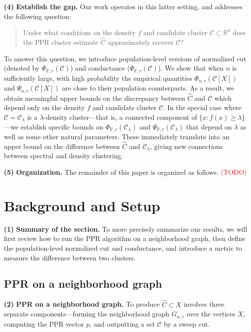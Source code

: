 \documentclass{article}
\newcommand{\Reals}{\mathbb{R}}
\newcommand{\1}{\mathbf{1}}
\newcommand{\Rd}{\Reals^d}
\newcommand{\mc}[1]{\mathcal{#1}}
\newcommand{\Pbb}{\mathbb{P}}
\newcommand{\wh}[1]{\widehat{#1}}
\theoremstyle{alden}
\theoremstyle{aldenthm}
\theoremstyle{definition}
\theoremstyle{remark}
\begin{document}
\textbf{(4)} \textbf{Establish the gap.} Our work operates in this latter setting, and addresses the following question:
\begin{quote}
	Under what conditions on the density $f$ and candidate cluster $\mc{C} \subset \Rd$ does the PPR cluster estimate $\wh{C}$ approximately recover $\mc{C}$?
\end{quote}
To answer this question, we introduce population-level versions of normalized cut (denoted by $\Phi_{\Pbb,r}(\mc{C})$) and conductance ($\Psi_{\Pbb,r}(\mc{C})$). We show that when $n$ is sufficiently large, with high probability the empirical quantities $\Phi_{n,r}(\mc{C}[X])$ and $\Psi_{n,r}(\mc{C}[X])$ are close to their population counterparts. As a result, we obtain meaningful upper bounds on the discrepancy between $\wh{C}$ and $\mc{C}$ which depend only on the density $f$ and candidate cluster $\mc{C}$. In the special case where $\mc{C} = \mc{C}_{\lambda}$ is a $\lambda$-density cluster---that is, a connected component of $\{x: f(x) \geq \lambda \}$---we establish specific bounds on $\Phi_{\Pbb,r}(\mc{C}_{\lambda})$ and $\Psi_{\Pbb,r}(\mc{C}_{\lambda})$ that depend on $\lambda$ as well as some other natural parameters. These immediately translate into an upper bound on the difference between $\wh{C}$ and $\mc{C}_{\lambda}$, giving new connections between spectral and density clustering.

\textbf{(5)} \textbf{Organization.} The remainder of this paper is organized as follows. \textcolor{red}{(TODO)} 

\section{Background and Setup}
\textbf{(1)} \textbf{Summary of the section.} To more precisely summarize our results, we will first review how to run the PPR algorithm on a neighborhood graph, then define the population-level normalized cut and conductance, and introduce a metric to measure the difference between two clusters.

\subsection{PPR on a neighborhood graph}

\textbf{(2)} \textbf{PPR on a neighborhood graph.} To produce $\wh{C} \subset X$ involves three separate components---forming the neighborhood graph $G_{n,r}$ over the vertices $X$, computing the PPR vector $p$, and outputting a set $\mc{C}$ by a sweep cut.
\end{document}

